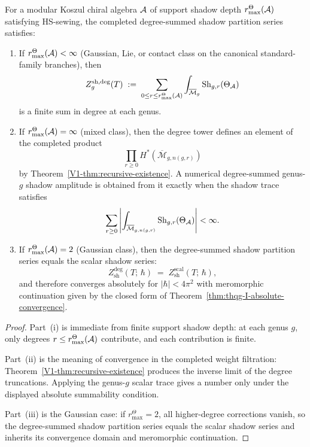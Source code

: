 \begin{theorem}
\label{thm:thqg-I-full-convergence}
For a modular Koszul chiral algebra $\mathcal{A}$ of support shadow depth
\(r^\Theta_{\max}(\mathcal{A})\)
satisfying HS-sewing, the completed degree-summed shadow partition
series satisfies:
\begin{enumerate}[label=\textup{(\roman*)}]
\item If \(r^\Theta_{\max}(\mathcal{A})<\infty\) (Gaussian, Lie, or contact
 class on the canonical standard-family branches), then
\begin{equation}%
Z_g^{\mathrm{sh,deg}}(T)
\;:=\;
\sum_{0\le r\le r^\Theta_{\max}(\cA)}
\int_{\overline{\mathcal{M}}_g}
\operatorname{Sh}_{g,r}(\Theta_\cA)
\end{equation}
is a finite sum in degree at each genus.
\item If \(r^\Theta_{\max}(\mathcal{A})=\infty\) (mixed class), then the degree tower
defines an element of the completed product
\[
\prod_{r \geq 0}
H^*(\overline{\mathcal{M}}_{g,n(g,r)})
\]
by Theorem~\ref{V1-thm:recursive-existence}. A numerical
degree-summed genus-$g$ shadow amplitude is obtained from it exactly
when the shadow trace
satisfies
\[
\sum_{r \geq 0}
\left|
\int_{\overline{\mathcal{M}}_{g,n(g,r)}}
\operatorname{Sh}_{g,r}(\Theta_{\mathcal{A}})
\right| < \infty .
\]
\item If \(r^\Theta_{\max}(\mathcal{A})=2\) (Gaussian class), then the degree-summed shadow
partition series equals the scalar shadow series:
\begin{equation}%
Z_{\mathrm{sh}}^{\mathrm{deg}}(T;\,\hbar)
\;=\;
Z_{\mathrm{sh}}^{\mathrm{scal}}(T;\,\hbar),
\end{equation}
and therefore converges absolutely for $|\hbar| < 4\pi^2$ with
meromorphic continuation given by the closed form of
Theorem~\ref{thm:thqg-I-absolute-convergence}.
\end{enumerate}
\end{theorem}

\begin{proof}
Part~(i) is immediate from finite support shadow depth: at each genus \(g\),
only degrees \(r\le r^\Theta_{\max}(\mathcal{A})\) contribute, and each contribution is
finite.

Part~(ii) is the meaning of convergence in the completed weight
filtration: Theorem~\ref{V1-thm:recursive-existence} produces the
inverse limit of the degree truncations. Applying the genus-$g$ scalar
trace gives a number only under the displayed absolute summability
condition.

Part~(iii) is the Gaussian case: if \(r^\Theta_{\max}=2\), all higher-degree
corrections vanish, so the degree-summed shadow partition series
equals the scalar shadow series and inherits its convergence domain and
meromorphic continuation.
\end{proof}

